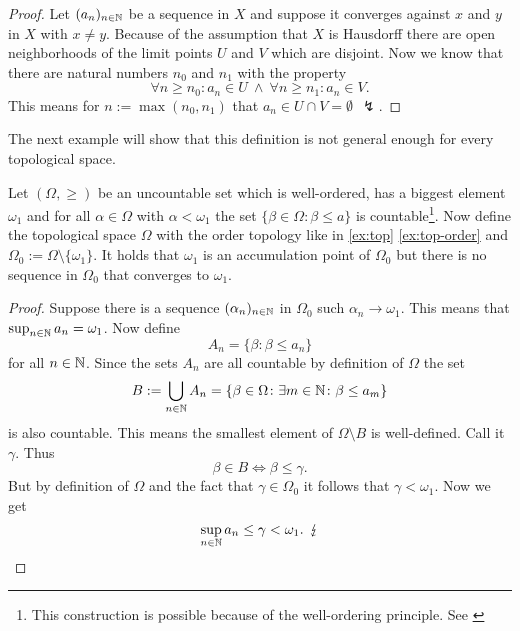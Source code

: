 \begin{proof}
  Let $(a_n)_{n \in \mathbb{N}}$ be a sequence in $X$ and suppose it converges against $x$ and $y$ in $X$ with $x \neq y$. 
  Because of the assumption that $X$ is Hausdorff there are open neighborhoods of the limit points $U$ and $V$ which are disjoint. 
  Now we know that there are natural numbers $n_0$ and $n_1$ with the property
  \begin{equation*}
    \forall n \geq n_0\colon a_n \in U \: \land \: \forall n \geq n_1\colon a_n \in V.
  \end{equation*}
  This means for $n := \max(n_0, n_1)$ that $a_n \in U \cap V = \emptyset \:\: \lightning$.
\end{proof}

The next example will show that this definition is not general enough for every topological space.

\begin{ex}\label{ex:ordertop-uncount}
  Let $(\Omega, \geq)$ be an uncountable set which is well-ordered, has a biggest element $\omega_1$ and for all $\alpha \in \Omega$ with $\alpha < \omega_1$ the set $\{\beta \in \Omega\colon \beta \leq a\}$ is countable\footnote{This construction is possible because of the well-ordering principle. See \cite[p. 53]{BvQMT}}.
  Now define the topological space $\Omega$ with the order topology like in \ref{ex:top} \ref{ex:top-order} and $\Omega_0 := \Omega\setminus \{\omega_1\}$.
  It holds that $\omega_1$ is an accumulation point of $\Omega_0$ but there is no sequence in $\Omega_0$ that converges to $\omega_1$.
\end{ex}

\begin{proof}
  Suppose there is a sequence $(\alpha_n)_{n\in\mathbb{N}}$ in $\Omega_0$ such $\alpha_n \to \omega_1$. This means that $\sup_{n\in\mathbb{N}} a_n = \omega_1$. Now define
  \begin{equation*}
    A_n = \{\beta\colon \beta \leq a_n\}
  \end{equation*}
  for all $n \in \mathbb{N}$. Since the sets $A_n$ are all countable by definition of $\Omega$ the set
  \begin{equation*}
    B := \bigcup\limits_{n\in\mathbb{N}} A_n = \{\beta \in \Omega\colon \exists m\in\mathbb{N} \colon \beta \leq a_m \}
  \end{equation*}
  is also countable. This means the smallest element of $\Omega\setminus B$ is well-defined. Call it $\gamma$. Thus
  \begin{equation*}
    \beta \in B \iff \beta \leq \gamma. 
  \end{equation*}
  But by definition of $\Omega$ and the fact that $\gamma \in \Omega_0$ it follows that $\gamma < \omega_1$. Now we get
  \begin{equation*}
    \sup\limits_{n\in\mathbb{N}} a_n \leq \gamma < \omega_1. \:\: \lightning \qedhere
  \end{equation*}
\end{proof}

